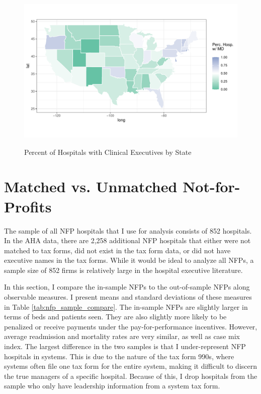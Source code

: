 \documentclass[12pt]{article}
\begin{document}
\begin{figure}[ht!]
    \centering
    \caption{Percent of Hospitals with Clinical Executives by State}
    \includegraphics[width=\textwidth]{Objects/has_doc_avg_map.pdf}
    \label{fig:state_doc}
\end{figure}




\section{Matched vs. Unmatched Not-for-Profits}\label{app:matched}

The sample of all NFP hospitals that I use for analysis consists of 852 hospitals. In the AHA data, there are 2,258 additional NFP hospitals that either were not matched to tax forms, did not exist in the tax form data, or did not have executive names in the tax forms. While it would be ideal to analyze all NFPs, a sample size of 852 firms is relatively large in the hospital executive literature. 

In this section, I compare the in-sample NFPs to the out-of-sample NFPs along observable measures. I present means and standard deviations of these measures in Table \ref{tab:nfp_sample_compare}. The in-sample NFPs are slightly larger in terms of beds and patients seen. They are also slightly more likely to be penalized or receive payments under the pay-for-performance incentives. However, average readmission and mortality rates are very similar, as well as case mix index. The largest difference in the two samples is that I under-represent NFP hospitals in systems. This is due to the nature of the tax form 990s, where systems often file one tax form for the entire system, making it difficult to discern the true managers of a specific hospital. Because of this, I drop hospitals from the sample who only have leadership information from a system tax form. 
\end{document}
